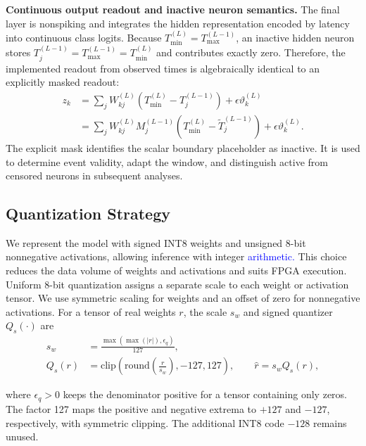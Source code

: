 \documentclass[12pt]{article}
\newcommand{\rev}[1]{\textcolor{blue}{#1}}
\begin{document}
\textbf{Continuous output readout and inactive neuron semantics.}
The final layer is nonspiking and integrates the hidden representation encoded by latency into continuous class logits. Because $T_{\min}^{(L)}=T_{\max}^{(L-1)}$, an inactive hidden neuron stores $T_j^{(L-1)}=T_{\max}^{(L-1)}=T_{\min}^{(L)}$ and contributes exactly zero. Therefore, the implemented readout from observed times is algebraically identical to an explicitly masked readout:
\begin{equation}
\begin{aligned}
z_k
&=\sum_j W_{kj}^{(L)}\!\left(T_{\min}^{(L)}-T_j^{(L-1)}\right)+\epsilon\vartheta_k^{(L)}\\
&=\sum_j W_{kj}^{(L)}M_j^{(L-1)}\!\left(T_{\min}^{(L)}-\tilde{T}_j^{(L-1)}\right)+\epsilon\vartheta_k^{(L)}.
\end{aligned}
\label{eq:masked_logit}
\end{equation}
The explicit mask identifies the scalar boundary placeholder as inactive. It is used to determine event validity, adapt the window, and distinguish active from censored neurons in subsequent analyses.

\subsection{Quantization Strategy}
We represent the model with signed INT8 weights and unsigned 8-bit nonnegative activations, allowing inference with integer \rev{arithmetic.} This choice reduces the data volume of weights and activations and suits FPGA execution. Uniform 8-bit quantization assigns a separate scale to each weight or activation tensor. We use symmetric scaling for weights and an offset of zero for nonnegative activations. For a tensor of real weights $r$, the scale $s_w$ and signed quantizer $Q_s(\cdot)$ are
\begin{equation}
\begin{aligned}
s_w &= \frac{\max\!\left(\max(|r|),\epsilon_q\right)}{127},\\
Q_s(r) &= \mathrm{clip}\!\left(\mathrm{round}\!\left(\frac{r}{s_w}\right),-127,127\right),
\qquad \hat{r}=s_w Q_s(r),
\end{aligned}
\label{eq:quant_w}
\end{equation}

where $\epsilon_q>0$ keeps the denominator positive for a tensor containing only zeros. The factor 127 maps the positive and negative extrema to $+127$ and $-127$, respectively, with symmetric clipping. The additional INT8 code $-128$ remains unused.
\end{document}
